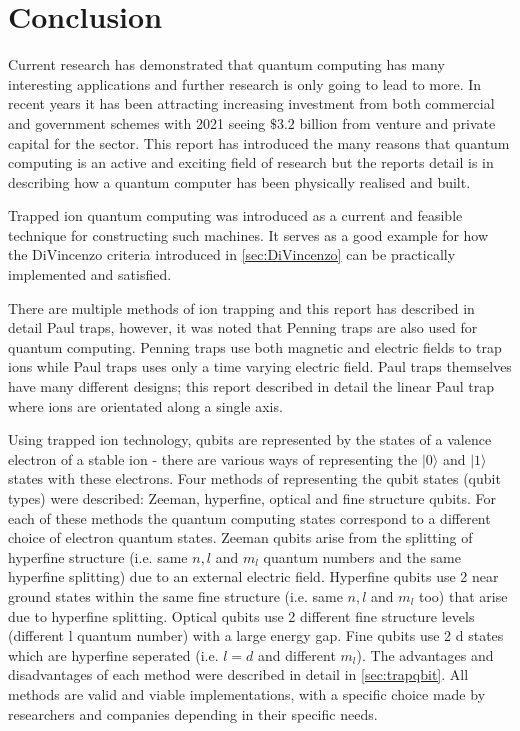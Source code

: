 \section{Conclusion}
Current research has demonstrated that quantum computing has many interesting applications and further research is only going to lead to more. 
In recent years it has been attracting increasing investment from both commercial and government schemes with 2021 seeing $\$ 3.2$ billion from venture and private capital for the sector. 
This report has introduced the many reasons that quantum computing is an active and exciting field of research but the reports detail is in describing how a quantum computer has been physically realised and built. 

Trapped ion quantum computing was introduced as a current and feasible technique for constructing such machines. It serves as a good example for how the DiVincenzo criteria introduced in \cref{sec:DiVincenzo} can be practically implemented and satisfied.

There are multiple methods of ion trapping and this report has described in detail Paul traps, however, it was noted that Penning traps are also used for quantum computing.
Penning traps use both magnetic and electric fields to trap ions while Paul traps uses only a time varying electric field. Paul traps themselves have many different designs; this report described in detail the linear Paul trap where ions are orientated along a single axis.

Using trapped ion technology, qubits are represented by the states of a valence electron of a stable ion - there are various ways of representing the $|0\rangle$ and $|1\rangle$ states with these electrons.
Four methods of representing the qubit states (qubit types) were described: Zeeman, hyperfine, optical and fine structure qubits. 
For each of these methods the quantum computing states correspond to a different choice of electron quantum states.
Zeeman qubits arise from the splitting of hyperfine structure (i.e. same $n, l$ and $m_l$ quantum numbers and the same hyperfine splitting) due to an external electric field. 
Hyperfine qubits use 2 near ground states within the same fine structure (i.e. same $n, l$ and $m_l$ too) that arise due to hyperfine splitting.
Optical qubits use 2 different fine structure levels (different l quantum number) with a large energy gap.
Fine qubits use 2 d states which are hyperfine seperated (i.e. $l=d$ and different $m_l$).
The advantages and disadvantages of each method were described in detail in \cref{sec:trapqbit}. All methods are valid and viable implementations, with a specific choice made by researchers and companies depending in their specific needs. 

